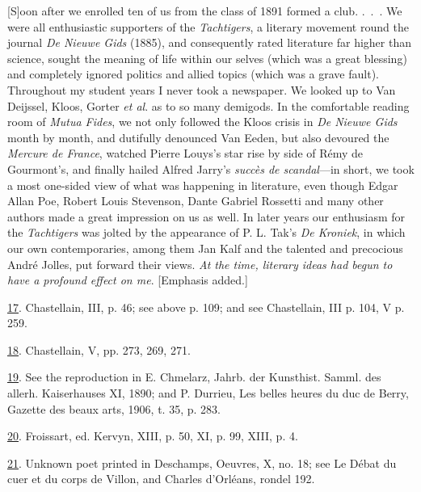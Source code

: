 {[}S{]}oon after we enrolled ten of us from the class of 1891 formed a
club. .~.~. We were all enthusiastic supporters of the
\emph{Tachtigers}, a literary movement round the journal \emph{De Nieuwe
Gids} (1885), and consequently rated literature far higher than science,
sought the meaning of life within our selves (which was a great
blessing) and completely ignored politics and allied topics (which was a
grave fault). Throughout my student years I never took a newspaper. We
looked up to Van Deijssel, Kloos, Gorter \emph{et al}. as to so many
demigods. In the comfortable reading room of \emph{Mutua Fides}, we not
only followed the Kloos crisis in \emph{De Nieuwe Gids} month by month,
and dutifully denounced Van Eeden, but also devoured the \emph{Mercure
de France}, watched Pierre Louys's star rise by side of Rémy de
Gourmont's, and finally hailed Alfred Jarry's \emph{succès de
scandal}---in short, we took a most one-sided view of what was happening
in literature, even though Edgar Allan Poe, Robert Louis Stevenson,
Dante Gabriel Rossetti and many other authors made a great impression on
us as well. In later years our enthusiasm for the \emph{Tachtigers} was
jolted by the appearance of P. L. Tak's \emph{De Kroniek}, in which our
own contemporaries, among them Jan Kalf and the talented and precocious
André Jolles, put forward their views. \emph{At the time, literary ideas
had begun to have a profound effect on me}. {[}Emphasis added.{]}

\protect\hypertarget{23_NOTES.xhtmlux5cux23page_436}{\protect\hyperlink{21_Chapter_Thirteen__IMAGE_AND_WORD.xhtmlux5cux23id_276}{17}}.
Chastellain, III, p. 46; see above p. 109; and see Chastellain, III p.
104, V p. 259.

\protect\hypertarget{23_NOTES.xhtmlux5cux23id_275}{\protect\hyperlink{21_Chapter_Thirteen__IMAGE_AND_WORD.xhtmlux5cux23id_274}{18}}.
Chastellain, V, pp. 273, 269, 271.

\protect\hypertarget{23_NOTES.xhtmlux5cux23id_273}{\protect\hyperlink{21_Chapter_Thirteen__IMAGE_AND_WORD.xhtmlux5cux23id_272}{19}}.
See the reproduction in E. Chmelarz, Jahrb. der Kunsthist. Samml. des
allerh. Kaiserhauses XI, 1890; and P. Durrieu, Les belles heures du duc
de Berry, Gazette des beaux arts, 1906, t. 35, p. 283.

\protect\hypertarget{23_NOTES.xhtmlux5cux23id_271}{\protect\hyperlink{21_Chapter_Thirteen__IMAGE_AND_WORD.xhtmlux5cux23id_270}{20}}.
Froissart, ed. Kervyn, XIII, p. 50, XI, p. 99, XIII, p. 4.

\protect\hypertarget{23_NOTES.xhtmlux5cux23id_269}{\protect\hyperlink{21_Chapter_Thirteen__IMAGE_AND_WORD.xhtmlux5cux23id_268}{21}}.
Unknown poet printed in Deschamps, Oeuvres, X, no. 18; see Le Débat du
cuer et du corps de Villon, and Charles d'Orléans, rondel 192.

